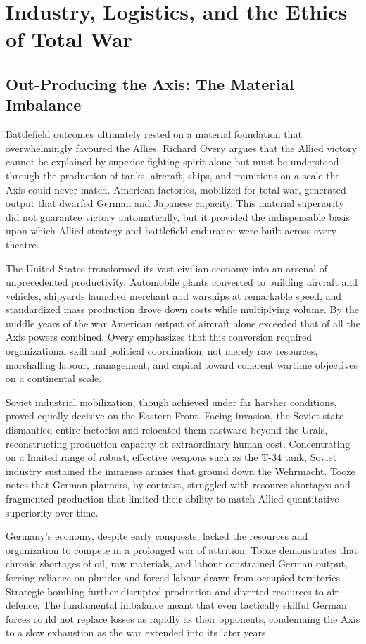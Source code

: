 \section{Industry, Logistics, and the Ethics of Total War}

\subsection{Out-Producing the Axis: The Material Imbalance}
Battlefield outcomes ultimately rested on a material foundation that overwhelmingly favoured the Allies. Richard Overy argues that the Allied victory cannot be explained by superior fighting spirit alone but must be understood through the production of tanks, aircraft, ships, and munitions on a scale the Axis could never match. American factories, mobilized for total war, generated output that dwarfed German and Japanese capacity. This material superiority did not guarantee victory automatically, but it provided the indispensable basis upon which Allied strategy and battlefield endurance were built across every theatre.

The United States transformed its vast civilian economy into an arsenal of unprecedented productivity. Automobile plants converted to building aircraft and vehicles, shipyards launched merchant and warships at remarkable speed, and standardized mass production drove down costs while multiplying volume. By the middle years of the war American output of aircraft alone exceeded that of all the Axis powers combined. Overy emphasizes that this conversion required organizational skill and political coordination, not merely raw resources, marshalling labour, management, and capital toward coherent wartime objectives on a continental scale.

Soviet industrial mobilization, though achieved under far harsher conditions, proved equally decisive on the Eastern Front. Facing invasion, the Soviet state dismantled entire factories and relocated them eastward beyond the Urals, reconstructing production capacity at extraordinary human cost. Concentrating on a limited range of robust, effective weapons such as the T-34 tank, Soviet industry sustained the immense armies that ground down the Wehrmacht. Tooze notes that German planners, by contrast, struggled with resource shortages and fragmented production that limited their ability to match Allied quantitative superiority over time.

Germany's economy, despite early conquests, lacked the resources and organization to compete in a prolonged war of attrition. Tooze demonstrates that chronic shortages of oil, raw materials, and labour constrained German output, forcing reliance on plunder and forced labour drawn from occupied territories. Strategic bombing further disrupted production and diverted resources to air defence. The fundamental imbalance meant that even tactically skilful German forces could not replace losses as rapidly as their opponents, condemning the Axis to a slow exhaustion as the war extended into its later years.

